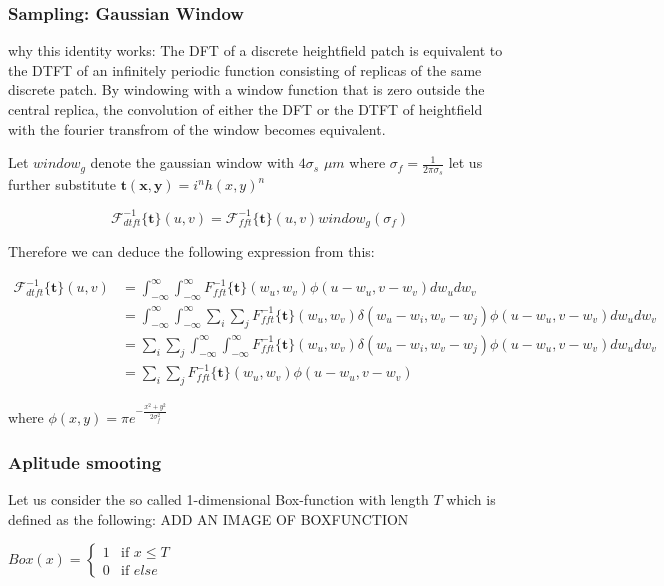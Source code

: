 \subsubsection{Sampling: Gaussian Window}
why this identity works:
The DFT of a discrete heightfield patch is equivalent to the DTFT of an infinitely periodic function consisting of replicas of the same discrete patch. By windowing with a window function that is zero outside the central replica, the convolution of either the DFT or the DTFT of heightfield with the fourier transfrom of the window becomes equivalent.


Let $window_g$ denote the gaussian window with $4\sigma_s$ $\mu m$ where $\sigma_f = \frac{1}{2\pi\sigma_s}$
let us further substitute $\mathbf{t(x,y)}=i^n h(x,y)^n$

\begin{equation}
\mathcal{F}_{dtft}^{-1}\{\mathbf{t}\}(u,v) = \mathcal{F}_{fft}^{-1}\{\mathbf{t}\}(u,v)window_g(\sigma_f)
\end{equation} 

Therefore we can deduce the following expression from this:

\begin{align*}
\mathcal{F}_{dtft}^{-1}\{\mathbf{t}\}(u,v)
& = \int_{-\infty}^{\infty} \int_{-\infty}^{\infty} {F}_{fft}^{-1}\{\mathbf{t}\}(w_u,w_v) \phi(u-w_u, v-w_v) dw_u dw_v \\
& = \int_{-\infty}^{\infty} \int_{-\infty}^{\infty} \sum_i \sum_j {F}_{fft}^{-1}\{\mathbf{t}\}(w_u,w_v) \delta(w_u-w_i, w_v-w_j)\phi(u-w_u, v-w_v) dw_u dw_v \\
& = \sum_i \sum_j \int_{-\infty}^{\infty} \int_{-\infty}^{\infty}  {F}_{fft}^{-1}\{\mathbf{t}\}(w_u,w_v) \delta(w_u-w_i, w_v-w_j)\phi(u-w_u, v-w_v) dw_u dw_v \\
& = \sum_i \sum_j {F}_{fft}^{-1}\{\mathbf{t}\}(w_u,w_v) \phi(u-w_u, v-w_v)
\end{align*}

where $\phi(x,y) = \pi e^{-\frac{x^2 + y^2}{2\sigma_{f}^2}}$

\subsubsection{Aplitude smooting}
Let us consider the so called 1-dimensional Box-function with length $T$ which is defined as the following: 
ADD AN IMAGE OF BOXFUNCTION

$
Box(x) =
\left\{
	\begin{array}{ll}
		1  & \mbox{if } x \leq T \\
		0 & \mbox{if } else
	\end{array}
\right.
$

